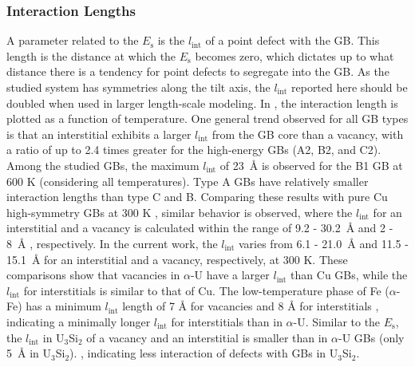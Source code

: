\documentclass[review]{elsarticle}
\begin{document}
\subsubsection{Interaction Lengths}
\par A parameter related to the $E_{\mathrm{s}}$ is the  $l_{\mathrm{int}}$ of a point defect with the GB. This length is the distance at which the $E_{\mathrm{s}}$ becomes zero, which dictates up to what distance there is a tendency for point defects to segregate into the GB. As the studied system has symmetries along the tilt axis, the $l_{\mathrm{int}}$ reported here should be doubled when used in larger length-scale modeling. In , the interaction length is plotted as a function of temperature. One general trend observed for all GB types is that an interstitial exhibits a larger  $l_{\mathrm{int}}$ from the GB core than a vacancy, with a ratio of up to 2.4 times greater for the high-energy GBs (A2, B2, and C2). Among the studied GBs, the maximum  $l_{\mathrm{int}}$ of 23~{\AA} is observed for the B1 GB at 600 K (considering all temperatures). Type A GBs have relatively smaller interaction lengths than type C and B. Comparing these results with pure Cu high-symmetry GBs at 300 K \cite{bai_cu_inter, bai_cu_gb_with_interstitial_inter}, similar behavior is observed, where the  $l_{\mathrm{int}}$ for an interstitial and a vacancy is calculated within the range of 9.2 - 30.2~{\AA} and 2 - 8~{\AA} \cite{bai_cu_inter}, respectively. In the current work, the  $l_{\mathrm{int}}$ varies from 6.1 - 21.0~{\AA} and 11.5 - 15.1~{\AA} for an interstitial and a vacancy, respectively, at 300 K. These comparisons show that vacancies in $\alpha$-U have a larger  $l_{\mathrm{int}}$ than Cu GBs, while the  $l_{\mathrm{int}}$ for interstitials is similar to that of Cu. The low-temperature phase of Fe ($\alpha$-Fe) has a minimum  $l_{\mathrm{int}}$ length of 7 {\AA} for vacancies and 8 {\AA} for interstitials \cite{tschopp2012probing}, indicating a minimally longer $l_{\mathrm{int}}$ for interstitials than in $\alpha$-U. Similar to the $E_{\mathrm{s}}$, the $l_{\mathrm{int}}$ in U$_\mathrm{3}$Si$_\mathrm{2}$ of a vacancy and an interstitial is smaller than in $\alpha$-U GBs (only 5~{\AA} in U$_3$Si$_2$). \cite{beeler2019}, indicating less interaction of defects with GBs in U$_3$Si$_2$. 
\end{document}
